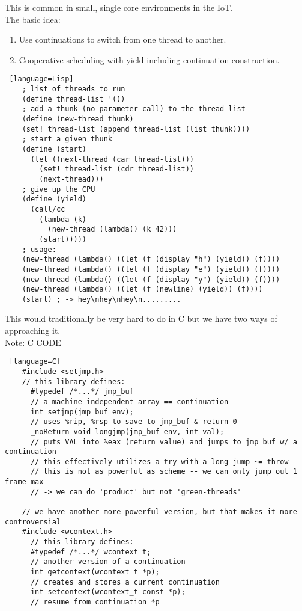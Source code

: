\documentclass[../../lecture_notes.tex]{subfiles}
\begin{document}
 This is common in small, single core environments in the IoT.\\
 The basic idea:
 \begin{enumerate} [itemsep=0mm]
	\item Use continuations to switch from one thread to another.
	\item Cooperative scheduling with yield including continuation construction.\\
\end{enumerate}
\begin{lstlisting} [language=Lisp]
	; list of threads to run
	(define thread-list '())
	; add a thunk (no parameter call) to the thread list
	(define (new-thread thunk)
	(set! thread-list (append thread-list (list thunk))))
	; start a given thunk
	(define (start)
	  (let ((next-thread (car thread-list)))
	    (set! thread-list (cdr thread-list))
	    (next-thread)))
 	; give up the CPU
	(define (yield)
	  (call/cc
	    (lambda (k)
	      (new-thread (lambda() (k 42)))
	    (start)))))
	; usage:
	(new-thread (lambda() ((let (f (display "h") (yield)) (f))))
	(new-thread (lambda() ((let (f (display "e") (yield)) (f))))
	(new-thread (lambda() ((let (f (display "y") (yield)) (f))))
	(new-thread (lambda() ((let (f (newline) (yield)) (f))))
	(start) ; -> hey\nhey\nhey\n.........
\end{lstlisting}
\noindent This would traditionally be very hard to do in C but we have two ways of approaching it.\\
Note: C CODE\\
\begin{lstlisting} [language=C]
	#include <setjmp.h>
	// this library defines:
	  #typedef /*...*/ jmp_buf 
	  // a machine independent array == continuation
	  int setjmp(jmp_buf env); 
	  // uses %rip, %rsp to save to jmp_buf & return 0
	  _noReturn void longjmp(jmp_buf env, int val);
	  // puts VAL into %eax (return value) and jumps to jmp_buf w/ a continuation
	  // this effectively utilizes a try with a long jump ~= throw
	  // this is not as powerful as scheme -- we can only jump out 1 frame max
	  // -> we can do 'product' but not 'green-threads'
 
	// we have another more powerful version, but that makes it more controversial
	#include <wcontext.h>
	  // this library defines:
	  #typedef /*...*/ wcontext_t;
	  // another version of a continuation
	  int getcontext(wcontext_t *p);
	  // creates and stores a current continuation
	  int setcontext(wcontext_t const *p);
	  // resume from continuation *p
\end{lstlisting} \medskip
\end{document}

